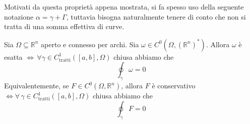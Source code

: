 \begin{remark}
	Motivati da questa proprietà appena mostrata, si fa spesso uso della seguente notazione $\alpha = \gamma + \Gamma$, tuttavia bisogna naturalmente tenere di conto che non si tratta di una somma effettiva di curve.
\end{remark}
\begin{theorem}[teorema CF1]
Sia $\Omega \subseteq \mathbb{R}^n$ aperto e connesso per archi. Sia $\omega \in C^0(\Omega, (\mathbb{R}^n)^*)$. Allora $\omega$ è esatta $\iff \, \forall \gamma \in C^1_\text{tratti} ([a, b], \Omega)$ chiusa abbiamo che
$$
\oint_\gamma \omega = 0
$$
Equivalentemente, se $F \in C^0(\Omega, \mathbb{R}^n)$, allora $F$ è conservativo $\iff \forall \, \gamma \in C^1_\text{tratti}([a, b], \Omega)$ chiusa abbiamo che
$$
\oint_\gamma F = 0
$$
\label{thm:teo_cf1}
\end{theorem}
